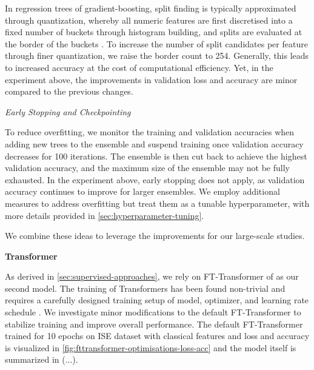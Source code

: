 In regression trees of gradient-boosting, split finding is typically approximated through quantization, whereby all numeric features are first discretised into a fixed number of buckets through histogram building, and splits are evaluated at the border of the buckets \autocites[][4]{dorogushCatBoostGradientBoosting}[][2]{keLightGBMHighlyEfficient2017}. To increase the number of split candidates per feature through finer quantization, we raise the border count to \num{254}. Generally, this leads to increased accuracy at the cost of computational efficiency. Yet, in the experiment above, the improvements in validation loss and accuracy are minor compared to the previous changes.

\emph{Early Stopping and Checkpointing}

To reduce overfitting, we monitor the training and validation accuracies when adding new trees to the ensemble and suspend training once validation accuracy decreases for 100 iterations. The ensemble is then cut back to achieve the highest validation accuracy, and the maximum size of the ensemble may not be fully exhausted. In the experiment above, early stopping does not apply, as validation accuracy continues to improve for larger ensembles. We employ additional measures to address overfitting but treat them as a tunable hyperparameter, with more details provided in \cref{sec:hyperparameter-tuning}.

We combine these ideas to leverage the improvements for our large-scale studies.

\textbf{Transformer}

As derived in \cref{sec:supervised-approaches}, we rely on FT-Transformer of \textcite[][4--5]{gorishniyRevisitingDeepLearning2021} as our second model. The training of Transformers has been found non-trivial and requires a carefully designed training setup of model, optimizer, and learning rate schedule \autocite[][1]{liuUnderstandingDifficultyTraining2020}. We investigate minor modifications to the default FT-Transformer to stabilize training and improve overall performance. The default FT-Transformer trained for 10 epochs on \gls{ISE} dataset with classical features and loss and accuracy is visualized in \cref{fig:fttransformer-optimisations-loss-acc} and the model itself is summarized in (...).

